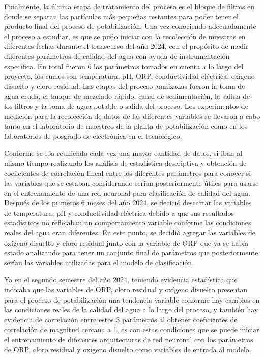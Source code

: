 Finalmente, la última etapa de tratamiento del proceso es el bloque de filtros en donde se separan las partículas más pequeñas restantes para poder tener el producto final del proceso de potabilización. Una vez conociendo 
adecuadamente el proceso a estudiar, es que se pudo iniciar con la recolección de muestras en diferentes fechas durante el transcurso del año 2024, con el propósito de medir diferentes parámetros de calidad del agua con ayuda 
de instrumentación específica. En total fueron 6 los parámetros tomados en cuenta a lo largo del proyecto, los cuales son temperatura, pH, ORP, conductividad eléctrica, oxígeno disuelto y cloro residual. Las etapas del proceso 
analizadas fueron la toma de agua cruda, el tanque de mezclado rápido, canal de sedimentación, la salida de los filtros y la toma de agua potable o salida del proceso. Los experimentos de medición para la recolección de 
datos de las diferentes variables se llevaron a cabo tanto en el laboratorio de muestreo de la planta de potabilización como en los laboratorios de posgrado de electrónica en el tecnológico.

Conforme se iba reuniendo cada vez una mayor cantidad de datos, si iban al mismo tiempo realizando los análisis de estadística descriptiva y obtención de coeficientes de correlación lineal entre los diferentes parámetros 
para conocer si las variables que se estaban considerando serían posteriormente útiles para usarse en el entrenamiento de una red neuronal para clasificación de calidad del agua. Después de los primeros 6 meses del año 2024, 
se decició descartar las variables de temperatura, pH y conductividad eléctrica debido a que sus resultados estadísticos no reflejaban un comportamiento variable conforme las condiciones reales del agua eran diferentes. En 
este punto, se decidió agregar las variables de oxígeno disuelto y cloro residual junto con la variable de ORP que ya se había estado analizando para tener un conjunto final de parámetros que posteriormente serían las variables 
utilizadas para el modelo de clasificación.

Ya en el segundo semestre del año 2024, teniendo evidencia estadística que indicaba que las variables de ORP, cloro residual y oxígeno disuelto presentan para el proceso de potabilización una tendencia variable conforme 
hay cambios en las condiciones reales de la calidad del agua a lo largo del proceso, y también hay evidencia de correlación entre estos 3 parámetros al obtener coeficientes de correlación de magnitud cercana a 1, es con estas 
condiciones que se puede iniciar el entrenamiento de diferentes arquitecturas de red neuronal con los parámetros de ORP, cloro residual y oxígeno disuelto como variables de entrada al modelo.

